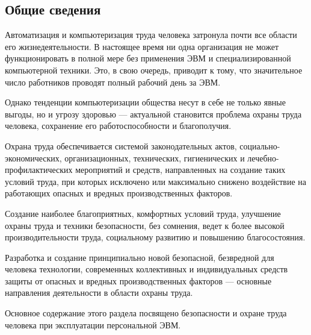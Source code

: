 \subsection*{Общие сведения}

Автоматизация и компьютеризация труда человека затронула почти все области его жизнедеятельности.
В настоящее время ни одна организация не может функционировать в полной мере без применения ЭВМ и специализированной компьютерной техники.
Это, в свою очередь, приводит к тому, что значительное число работников проводят полный рабочий день за ЭВМ.

Однако тенденции компьютеризации общества несут в себе не только явные выгоды, но и угрозу здоровью --- актуальной становится проблема охраны труда человека, сохранение его работоспособности и благополучия.

Охрана труда обеспечивается системой законодательных актов, социально-экономических, организационных, технических, гигиенических и лечебно-профилактических мероприятий и средств, направленных на создание таких условий труда, при которых исключено или максимально снижено воздействие на работающих опасных и вредных производственных факторов.

Создание наиболее благоприятных, комфортных условий труда, улучшение охраны труда и техники безопасности, без сомнения, ведет к более высокой производительности труда, социальному развитию и повышению благосостояния.

Разработка и создание принципиально новой безопасной, безвредной для человека технологии, современных коллективных и индивидуальных средств защиты от опасных и вредных производственных факторов --- основные направления деятельности в области охраны труда.

Основное содержание этого раздела посвящено безопасности и охране труда человека при эксплуатации персональной ЭВМ.
